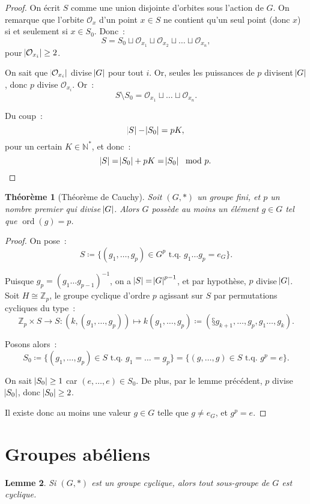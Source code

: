 \documentclass{article}
\newtheorem{thm}{Théorème}[section]
\newtheorem{lem}[thm]{Lemme}
\theoremstyle{definition}
\theoremstyle{remark}
\DeclareMathOperator{\ord}{ord}
\newcommand{\Z}{\mathbb Z}
\newcommand{\N}{\mathbb N}
\newcommand{\tq}{\text{ t.q. }}
\newcommand{\simeqq}{\cong}
\begin{document}
	\begin{proof} On écrit $S$ comme une union disjointe d'orbites sous l'action de $G$. On remarque que l'orbite $\mathcal O_x$ d'un point $x \in S$ ne
	contient qu'un seul point (donc $x$) si et seulement si $x \in S_0$. Donc~:
	\[S = S_0 \sqcup \mathcal O_{x_1} \sqcup \mathcal O_{x_2} \sqcup \ldots \sqcup \mathcal O_{x_n},\]
	pour $\abs {\mathcal O_{x_i}} \geq 2$.

	On sait que $\abs {\mathcal O_{x_i}}$ divise $\abs G$ pour tout $i$. Or, seules les puissances de $p$ divisent $\abs G$, donc $p$ divise $\mathcal O_{x_i}$.
	Or~:
	\[S \setminus S_0 = \mathcal O_{x_1} \sqcup \ldots \sqcup \mathcal O_{x_n}.\]

	Du coup~:
	\[\abs S - \abs {S_0} = pK,\]
	pour un certain $K \in \N^*$, et donc~:
	\[\abs S = \abs {S_0} + pK = \abs {S_0} \mod p.\]
	\end{proof}

	\begin{thm}[Théorème de Cauchy] Soit $(G, *)$ un groupe fini, et $p$ un nombre premier qui divise $\abs G$. Alors $G$ possède au moins un élément $g \in G$
	tel que $\ord(g) = p$.
	\end{thm}

	\begin{proof} On pose~:
	\[S \coloneqq \{(g_1, \ldots, g_p) \in G^p \tq g_1\ldots g_p = e_G\}.\]

	Puisque $g_p = (g_1\ldots g_{p-1})^{-1}$, on a $\abs S = \abs G^{p-1}$, et par hypothèse, $p$ divise $\abs G$. Soit $H \simeqq \Z_p$, le groupe cyclique d'ordre
	$p$ agissant sur $S$ par permutations cycliques du type~:
	\[\Z_p \times S \to S : \left(k, (g_1, \ldots, g_p)\right) \mapsto k(g_1, \ldots, g_p) \coloneqq \left(§g_{k+1}, \ldots, g_p, g_1\ldots, g_k\right).\]

	Posons alors~:
	\[S_0 \coloneqq \{(g_1, \ldots, g_p) \in S \tq g_1 = \ldots = g_p\} = \{(g, \ldots, g) \in S \tq g^p = e\}.\]

	On sait $\abs {S_0} \geq 1$ car $(e, \ldots, e) \in S_0$. De plus, par le lemme précédent, $p$ divise $\abs {S_0}$, donc $\abs {S_0} \geq 2$.

	Il existe donc au moins une valeur $g \in G$ telle que $g \neq e_G$, et $g^p = e$.
	\end{proof}

\section{Groupes abéliens}
	\begin{lem} Si $(G, *)$ est un groupe cyclique, alors tout sous-groupe de $G$ est cyclique.
	\end{lem}
\end{document}
